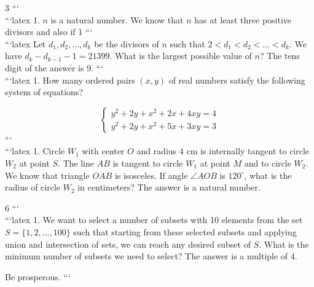 3
```
\\
```latex
1. \( n \) is a natural number. We know that \( n \) has at least three positive divisors and also if 
1
```
\\
```latex
Let $d_1, d_2, \ldots, d_k$ be the divisors of $n$ such that $2 < d_1 < d_2 < \ldots < d_k$. We have $d_k - d_{k-1} - 1 = 21399$. What is the largest possible value of $n$? The tens digit of the answer is 9.
```
\\
```latex
1. How many ordered pairs $(x, y)$ of real numbers satisfy the following system of equations?

\[
\begin{cases} 
y^2 + 2y + x^2 + 2x + 4xy = 4 \\
y^2 + 2y + x^2 + 5x + 3xy = 3 
\end{cases}
\]
```
\\
```latex
1. Circle $W_1$ with center $O$ and radius $4$ cm is internally tangent to circle $W_2$ at point $S$. The line $AB$ is tangent to circle $W_1$ at point $M$ and to circle $W_2$. We know that triangle $OAB$ is isosceles. If angle $\angle AOB$ is $120^\circ$, what is the radius of circle $W_2$ in centimeters? The answer is a natural number.

6
```
\\
```latex
1. We want to select a number of subsets with 10 elements from the set $S = \{1, 2, \ldots, 100\}$ such that starting from these selected subsets and applying union and intersection of sets, we can reach any desired subset of $S$. What is the minimum number of subsets we need to select? The answer is a multiple of 4.

Be prosperous.
```
\\
